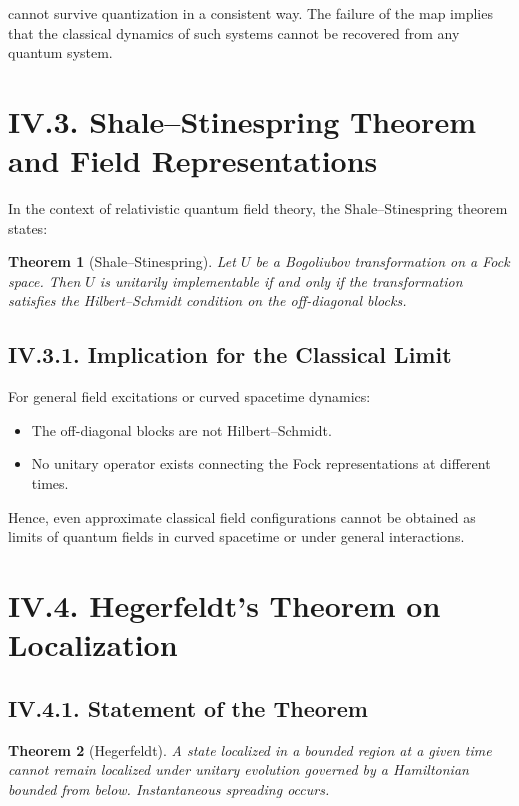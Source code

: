\documentclass[12pt,oneside]{book}
\theoremstyle{plain}
\newtheorem{theorem}{Theorem}[chapter]
\theoremstyle{definition}
\begin{document}
cannot survive quantization in a consistent way. The failure of the map implies that the classical dynamics of such systems cannot be recovered from any quantum system.

\section{IV.3. Shale–Stinespring Theorem and Field Representations}

In the context of relativistic quantum field theory, the Shale–Stinespring theorem states:

\begin{theorem}[Shale–Stinespring]
Let $U$ be a Bogoliubov transformation on a Fock space. Then $U$ is unitarily implementable if and only if the transformation satisfies the Hilbert–Schmidt condition on the off-diagonal blocks.
\end{theorem}

\subsection*{IV.3.1. Implication for the Classical Limit}

For general field excitations or curved spacetime dynamics:

\begin{itemize}
    \item The off-diagonal blocks are not Hilbert–Schmidt.
    \item No unitary operator exists connecting the Fock representations at different times.
\end{itemize}

Hence, even approximate classical field configurations cannot be obtained as limits of quantum fields in curved spacetime or under general interactions.

\section{IV.4. Hegerfeldt’s Theorem on Localization}

\subsection*{IV.4.1. Statement of the Theorem}

\begin{theorem}[Hegerfeldt]
A state localized in a bounded region at a given time cannot remain localized under unitary evolution governed by a Hamiltonian bounded from below. Instantaneous spreading occurs.
\end{theorem}
\end{document}
